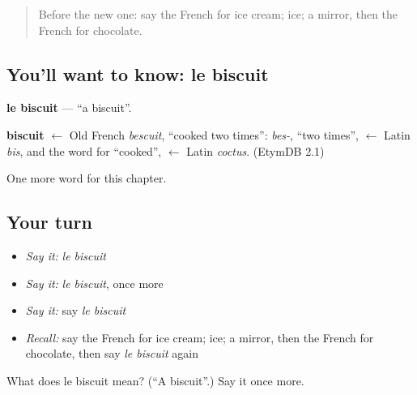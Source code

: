 \begin{quote}
Before the new one: say the French for ice cream; ice; a mirror, then the French for chocolate.
\end{quote}

\subsection*{You'll want to know: le biscuit}
\textbf{le biscuit} — \textquotedblleft{}a biscuit\textquotedblright{}.

\begin{cousinweb}
\textbf{biscuit} $\leftarrow$ Old French \emph{bescuit}, \textquotedblleft{}cooked two times\textquotedblright{}: \emph{bes-}, \textquotedblleft{}two times\textquotedblright{}, $\leftarrow$ Latin \emph{bis}, and the word for \textquotedblleft{}cooked\textquotedblright{}, $\leftarrow$ Latin \emph{coctus}. (EtymDB 2.1)
\end{cousinweb}

\begin{grammarlens}[title={What you've built}]
One more word for this chapter.
\end{grammarlens}

\subsection*{Your turn}
\begin{itemize}
\raggedright
  \item \emph{Say it:} \emph{le biscuit}
  \item \emph{Say it:} \emph{le biscuit}, once more
  \item \emph{Say it:} say \emph{le biscuit}
  \item \emph{Recall:} say the French for ice cream; ice; a mirror, then the French for chocolate, then say \emph{le biscuit} again
\end{itemize}

\begin{tcolorbox}[breakable,colback=teal!4,colframe=teal!35!black,title={Before you move on}]
What does le biscuit mean? (\textquotedblleft{}A biscuit\textquotedblright{}.) Say it once more.
\end{tcolorbox}

